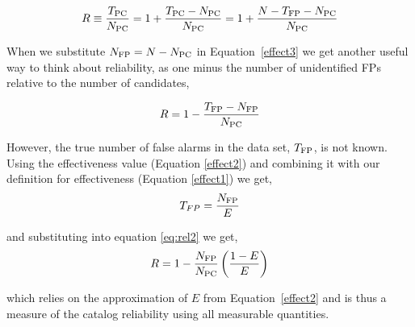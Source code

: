 \begin{equation}
\label{effect3}
R \equiv \frac{T_{\rm PC}}{N_{\rm PC}} =  1 + \frac{T_{\rm PC}-N_{\rm PC}}{N_{\rm PC}} 
= 1 + \frac{N - T_{\rm FP} - N_{\rm PC}}{N_{\rm PC}}
\end{equation}

\noindent When we substitute $N_{{\rm FP}}=N-N_{{\rm PC}}$ in Equation~\ref{effect3} we get another useful way to think about reliability, as one minus the number of unidentified FPs relative to the number of candidates,

\begin{equation}
\label{eq:rel2}
R = 1 - \frac{T_{\rm FP}-N_{\rm FP}}{N_{\rm PC}}
\end{equation}

\noindent However, the true number of false alarms in the \opstce{} data set, $T_{\rm FP}$, is not known. Using the effectiveness value (Equation \ref{effect2}) and combining it with our definition for effectiveness (Equation \ref{effect1}) we get,
\begin{equation}
T_{FP} = \frac{N_{\rm FP}}{E} 
\end{equation}

\noindent and substituting into equation \ref{eq:rel2} we get,
\textbf{
\begin{equation}
R= 1 - \frac{N_{\rm FP}}{N_{\rm PC}}\left(\frac{1-E}{E}\right)
\end{equation}
}

\noindent which relies on the approximation of $E$ from Equation~\ref{effect2} and is thus a measure of the catalog reliability using all measurable quantities.




